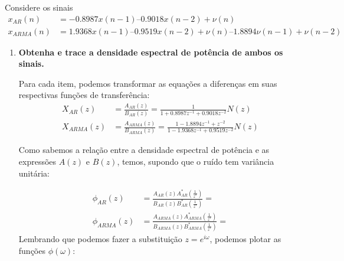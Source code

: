 \noindent
\begin{tcolorbox}[colframe=black,width =7cm,colback=gray!20,arc=0pt]
\end{tcolorbox}

Considere os sinais
\begin{align*}
    x_{AR}(n) &= -0.8987 x(n-1) –0.9018 x(n-2) + \nu(n) \\
    x_{ARMA}(n) &= 1.9368 x(n-1) –0.9519 x(n-2) + \nu(n) –1.8894 \nu(n-1) + \nu(n-2)
\end{align*}

\begin{enumerate}[label={\bf \alph*:},series=exerc,align=left]
    \item \textbf{Obtenha e trace a densidade espectral de potência de ambos os sinais.}

    Para cada item, podemos transformar as equações a diferenças em suas respectivas funções de transferência:
    \begin{align*}
        X_{AR}(z) &= \frac{A_{AR}(z)}{B_{AR}(z)} = \frac{1}{1+0.8987z^{-1}+0.9018z^{-2}}N(z) \\
        X_{ARMA}(z) &= \frac{A_{ARMA}(z)}{B_{ARMA}(z)} = \frac{1-1.8894z^{-1}+z^{-2}}{1-1.9368z^{-1}+0.9519z^{-2}}N(z)
    \end{align*}

    Como sabemos a relação entre a densidade espectral de potência e as expressões $A(z)$ e $B(z)$, temos, supondo que o ruído tem variância unitária:

    \begin{align*}
        \phi_{AR}(z) &= \frac{A_{AR}(z)A^*_{AR}(\frac{1}{z^*})}{B_{AR}(z)B^*_{AR}(\frac{1}{z^*})} =  \\
        \phi_{ARMA}(z) &= \frac{A_{ARMA}(z)A^*_{ARMA}(\frac{1}{z^*})}{B_{ARMA}(z)B^*_{ARMA}(\frac{1}{z^*})} = 
    \end{align*}
    Lembrando que podemos fazer a substituição $z=e^{i\omega}$, podemos plotar as funções $\phi(\omega)$:


\end{enumerate}
